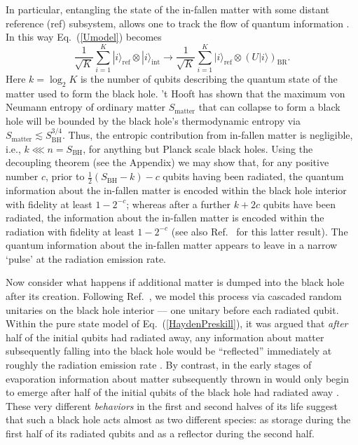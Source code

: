 \documentclass[twocolumn,aps,prl]{revtex4}
\begin{document}
In particular, entangling the state of the in-fallen matter with some
distant reference (ref) subsystem, allows one to track the flow of
quantum information \cite{me,Hayden07}. In this way Eq.~(\ref{Umodel})
becomes
\begin{equation}
\frac{1}{\sqrt{K}}\sum_{i=1}^{K}
|i\rangle_{\text{ref}}\otimes|i\rangle_{\text{int}}\rightarrow
\frac{1}{\sqrt{K}}\sum_{i=1}^{K}
|i\rangle_{\text{ref}}\otimes(U|i\rangle)_{\text{BR}}.
\label{HaydenPreskill}
\end{equation}
Here $k=\log_2 K$ is the number of qubits describing the quantum state
of the matter used to form the black hole. 't Hooft \cite{tHooft93} has
shown that the maximum von Neumann entropy of ordinary matter
$S_{\text{matter}}$ that can collapse to form a black hole will be
bounded by the black hole's thermodynamic entropy via
$S_{\text{matter}}\lesssim S_{\text{BH}}^{3/4}$.
Thus, the entropic contribution from in-fallen matter is negligible,
i.e., $k\lll n=S_{\text{BH}}$, for anything but Planck scale black
holes. Using the decoupling theorem \cite{Abey06} (see the Appendix)
we may show that, for any positive number $c$, prior
to $\frac{1}{2}(S_{\text{BH}}-k)-c$ qubits having been radiated, the
quantum information about the in-fallen matter
is encoded within the black hole interior with fidelity at least
$1-2^{-c}$; whereas after a further $k + 2c$ qubits have been radiated,
the information about the in-fallen matter is encoded within the
radiation with fidelity at least $1-2^{-c}$ (see also
Ref.~ for this latter result). The quantum
information about the in-fallen matter appears to leave in a narrow
`pulse' at the radiation emission rate.

Now consider what happens if additional matter is dumped into the 
black hole after its creation. Following Ref.~, 
we model this process via cascaded random unitaries on the black hole 
interior --- one unitary before each radiated qubit. Within the pure 
state model of Eq.~(\ref{HaydenPreskill}), it was argued \cite{Hayden07} 
that {\it after\/} half of the initial qubits had radiated away, any
information about matter subsequently falling into the black hole
would be ``reflected'' immediately at roughly the radiation emission
rate \cite{Hayden07}. By contrast, in the early stages of evaporation
information about matter subsequently thrown in would only begin
to emerge after half of the initial qubits of the black hole had
radiated away \cite{Hayden07}. These very different {\it behaviors\/}
in the first and second halves of its life suggest that such a black
hole acts almost as two different species: as storage during the first
half of its radiated qubits and as a reflector during the second half.
\end{document}
